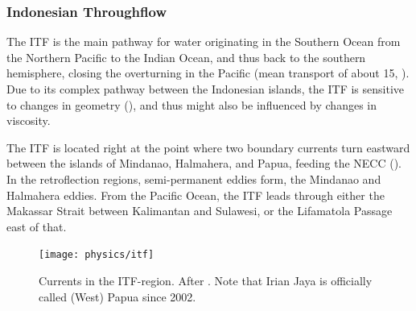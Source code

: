 \subsubsection{Indonesian Throughflow}
The \acf{ITF} is the main pathway for water originating in the Southern Ocean from the Northern Pacific to the Indian Ocean, and thus back to the southern hemisphere, closing the overturning in the Pacific (mean transport of about \SI{15}{\sv}, \cite{sprintall}). Due to its complex pathway between the Indonesian islands, the \ac{ITF} is sensitive to changes in geometry (\cite{jochumind}), and thus might also be influenced by changes in viscosity.

The \ac{ITF} is located right at the point where two boundary currents turn eastward between the islands of Mindanao, Halmahera, and Papua, feeding the \ac{NECC} (). In the retroflection regions, semi\hyp{}permanent eddies form, the Mindanao and Halmahera eddies. From the Pacific Ocean, the \ac{ITF} leads through either the Makassar Strait between Kalimantan and Sulawesi, or the Lifamatola Passage east of that.

\begin{figure}
	\centering
	\texttt{[image: physics/itf]}
	\caption[Currents in the \ac{ITF}-region.]{Currents in the \ac{ITF}-region. After \cite{godfreyind}. Note that Irian Jaya is officially called (West) Papua since 2002.}
	\label{fig:itf-currents}
\end{figure}